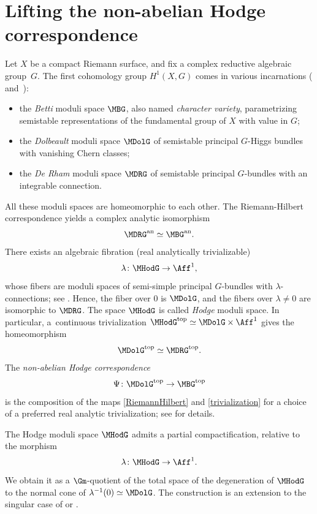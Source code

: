 \section{Lifting the non-abelian Hodge correspondence}\label{sec:p=wforresolution}
Let $X$ be a compact Riemann surface, and fix a complex reductive algebraic group~$G$.
The first cohomology group $H^1(X, G)$ comes in various incarnations (\cf \cite{Simpson1994I} and~\cite{Simpson1994}):
\begin{itemize}
\item the \emph{Betti} moduli space $\MBG$, also named \emph{character variety}, parametrizing semistable representations of the fundamental group of $X$ with value in $G$;
\item the \emph{Dolbeault} moduli space $\MDolG$ of semistable principal $G$-Higgs bundles with vanishing Chern classes;
\item the \emph{De Rham} moduli space $\MDRG$ of semistable principal $G$-bundles with an integrable connection.
\end{itemize}
All these moduli spaces are homeomorphic to each other. The Riemann-Hilbert correspondence yields a complex analytic isomorphism
\begin{equation}\label{RiemannHilbert}
\MDRG^{\mathrm{an}} \simeq \MBG^{\mathrm{an}}.
\end{equation}
There exists an algebraic fibration (real analytically trivializable)
\begin{equation}\label{Hodge}
\lambda\colon \MHodG \to \Aff^1,
\end{equation}
whose fibers are moduli spaces of semi-simple principal $G$-bundles with $\lambda$-con\-nections; see \cite{Simpson1997}. Hence, the fiber over $0$ is $\MDolG$, and the fibers over $\lambda \neq 0$ are isomorphic to $\MDRG$. The space $\MHodG$ is called \emph{Hodge} moduli space. In particular, a~continuous trivialization $\MHodG^{\mathrm{top}}\simeq \MDolG \times \Aff^1$ gives the homeomorphism%
\begin{equation}\label{trivialization}
\MDolG^{\mathrm{top}} \simeq \MDRG^{\mathrm{top}}.
\end{equation}
The \emph{non-abelian Hodge correspondence}
\[
\Psi\colon \MDolG^{\mathrm{top}} \to \MBG^{\mathrm{top}}
\]
is the composition of the maps \eqref{RiemannHilbert} and \eqref{trivialization} for a choice of a preferred real analytic trivialization; see \cite{Simpson1997} for details.

\label{sec:compactificationHodge}
The Hodge moduli space $\MHodG$ admits a partial compactification, relative to the morphism
\[
\lambda\colon \MHodG \to \Aff^1.
\]
We obtain it as a $\Gm$\nobreakdash-quotient of the total space of the degeneration of $\MHodG$ to the normal cone of $\lambda^{-1}(0) \simeq \MDolG$. The construction is an extension to the singular case of \cite[Lem.\,6.1]{HauselThaddeus03} or \cite[Th.\,7.2.1]{HauselLetellierRodriguez-Villegas2011}.

